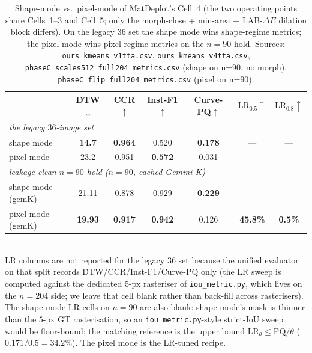 \documentclass{article}
\begin{document}
\begin{table}[h]
\centering
\caption{Shape-mode vs.\ pixel-mode of MatDeplot's Cell~4 (the two
operating points share Cells~1--3 and Cell~5; only the
morph-close + min-area + LAB-$\Delta E$ dilation block differs).
On the legacy $36$ set the shape mode wins shape-regime metrics; the pixel
mode wins pixel-regime metrics on the $n{=}90$ hold. Sources:
\texttt{ours\_kmeans\_v1tta.csv}, \texttt{ours\_kmeans\_v4tta.csv},
\texttt{phaseC\_scales512\_full204\_metrics.csv} (shape on n=90,
no morph),
\texttt{phaseC\_flip\_full204\_metrics.csv} (pixel on n=90).}
\label{tab:two-modes-app}
\small
\setlength{\tabcolsep}{4pt}
\begin{tabular}{l|cccc|cc}
\toprule
& DTW$\downarrow$ & CCR$\uparrow$ & Inst-F1$\uparrow$ & Curve-PQ$\uparrow$
& $\mathrm{LR}_{0.5}\uparrow$ & $\mathrm{LR}_{0.8}\uparrow$ \\
\midrule
\multicolumn{7}{l}{\emph{the legacy $36$-image set}} \\
shape mode  & \textbf{14.7} & \textbf{0.964} & 0.520 & \textbf{0.178} & --- & --- \\
pixel mode  & 23.2          & 0.951          & \textbf{0.572} & 0.031 & --- & --- \\
\midrule
\multicolumn{7}{l}{\emph{leakage-clean $n{=}90$ hold ($n{=}90$, cached Gemini-K)}} \\
shape mode (gemK)  & 21.11          & 0.878          & 0.929          & \textbf{0.229} & --- & --- \\
pixel mode (gemK)  & \textbf{19.93} & \textbf{0.917} & \textbf{0.942} & 0.126 & \textbf{45.8\%} & \textbf{0.5\%} \\
\bottomrule
\end{tabular}\\
\footnotesize{LR columns are not reported for the legacy $36$ set because
the unified evaluator on that split records DTW/CCR/Inst-F1/Curve-PQ
only (the LR sweep is computed against the dedicated 5-px rasteriser
of \texttt{iou\_metric.py}, which lives on the $n{=}204$ side; we
leave that cell blank rather than back-fill across rasterisers).
The shape-mode LR cells on $n{=}90$ are also blank: shape mode's
mask is thinner than the $5$-px GT rasterisation, so an
\texttt{iou\_metric.py}-style strict-IoU sweep would be
floor-bound; the matching reference is the upper bound
$\mathrm{LR}_{\theta}\le \mathrm{PQ}/\theta$ ($0.171/0.5{=}34.2\%$).
The pixel mode is the LR-tuned recipe.}
\end{table}
\end{document}
